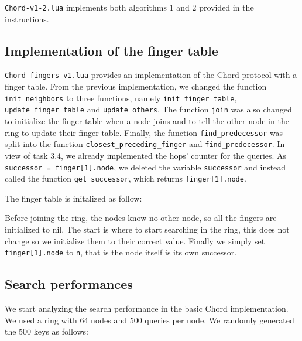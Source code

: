 \message{ !name(LSDS_project2_hayezl.tex)}\documentclass[a4paper, 11pt]{article}
\theoremstyle{plain}
\theoremstyle{definition}
\begin{document}
    \texttt{Chord-v1-2.lua} implements both algorithms 1 and 2 provided in the instructions.


  \subsection{Implementation of the finger table}
  \label{impl-fing-table}

    \texttt{Chord-fingers-v1.lua} provides an implementation of the Chord protocol with a finger table. From
    the previous implementation, we changed the function \texttt{init\_neighbors} to three functions, namely
    \texttt{init\_finger\_table}, \texttt{update\_finger\_table} and \texttt{update\_others}. The function
    \texttt{join} was also changed to initialize the finger table when a node joins and to tell the other node
    in the ring to update their finger table. Finally, the function \texttt{find\_predecessor} was split into
    the function \texttt{closest\_preceding\_finger} and \texttt{find\_predecessor}. In view of task 3.4, we
    already implemented the hops' counter for the queries. As \texttt{successor = finger[1].node}, we deleted
    the variable \texttt{successor} and instead called the function \texttt{get\_successor}, which returns \texttt{finger[1].node}.

    The finger table is initalized as follow:
    
    \begin{center}
      
    \end{center}

    Before joining the ring, the nodes know no other node, so all the fingers are initialized to nil. The
    start is where to start searching in the ring, this does not change so we initialize them to their correct
    value. Finally we simply set \texttt{finger[1].node} to \texttt{n}, that is the node itself is its own
    successor.


  \subsection{Search performances}
  \label{sec:search-performances}
  
    We start analyzing the search performance in the basic Chord implementation. We used a ring with 64 nodes
    and 500 queries per node. We randomly generated the 500 keys as follows:
    
\end{document}
